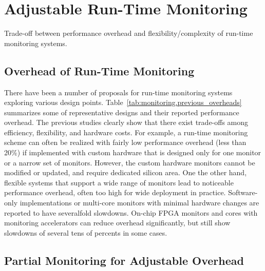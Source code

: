 \section{Adjustable Run-Time Monitoring}
\label{sec:monitoring}

\begin{table*}[t]
  \begin{center}
    \vspace{-0.0in}
    \begin{footnotesize}
    
    \end{footnotesize}
    \caption{Trade-off between performance overhead and flexibility/complexity of run-time monitoring systems.}
    \vspace{-0.2in}
    \label{tab:monitoring.previous_overheads}
  \end{center}
\end{table*}

\subsection{Overhead of Run-Time Monitoring}

There have been a number of proposals for run-time monitoring systems exploring various
design points. %
Table~\ref{tab:monitoring.previous_overheads} summarizes some of representative designs
and their reported performance overhead. The previous studies clearly show that there
exist trade-offs among efficiency, flexibility, and hardware costs. 
For example, a run-time monitoring scheme can often be realized with fairly low
performance overhead (less than 20\%) if implemented with custom hardware that is
designed only for one monitor or a narrow set of monitors. However, the custom
hardware monitors cannot be modified or updated, and require dedicated silicon area. 
One the other hand, flexible systems that support a wide range of monitors lead 
to noticeable performance overhead, often too high for wide deployment in practice.
Software-only implementations \cite{FIXME} or multi-core monitors with minimal
hardware changes \cite{lba-asid06} are reported to have severalfold slowdowns.
On-chip FPGA monitors \cite{flexcore-micro10} and cores with monitoring accelerators
\cite{lba-isca08, fade-hpca14} can reduce overhead significantly, but still show
slowdowns of several tens of percents in some cases.


\subsection{Partial Monitoring for Adjustable Overhead}

